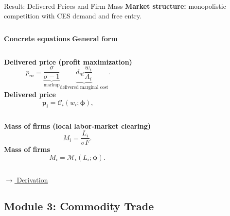 \documentclass[aspectratio=169,11pt]{beamer}
\newcommand{\B}[1]{\textcolor{blue1}{\textbf{#1}}}
\newcommand{\derivlink}[1]{%
  \hyperlink{#1}{\textcolor{blue1}{\footnotesize
  \(\longrightarrow\) Derivation}}}
\begin{document}
\begin{frame}[t,label=mainProduction]{Result: Delivered Prices and Firm Mass}
  \small
  \setlength{\abovedisplayskip}{3pt}
  \setlength{\belowdisplayskip}{3pt}
  \B{Market structure:} monopolistic competition with CES demand and free entry.

  \smallskip
  \begin{columns}[T,onlytextwidth]
      \B{Concrete equations}
      \B{General form}
  \end{columns}

  \smallskip
  \begin{columns}[T,onlytextwidth]
      \B{Delivered price (profit maximization)}
      \[
        p_{ni}
        =
        \underbrace{\frac{\sigma}{\sigma-1}}_{\text{markup}}
        \underbrace{d_{ni}\frac{w_i}{A_i}}_{\text{delivered marginal cost}}.
      \]
      \B{Delivered price}
      \[
        \mathbf p_i
        =\mathcal C_i(w_i;\boldsymbol\phi),
      \]
  \end{columns}

  \smallskip
  \begin{columns}[T,onlytextwidth]
      \B{Mass of firms (local labor-market clearing)}
      \[
        M_i=\frac{L_i}{\sigma F}.
      \]
      \B{Mass of firms}
      \[
        M_i
        =\mathcal M_i(L_i;\boldsymbol\phi).
      \]
  \end{columns}
  \smallskip
  \hfill\derivlink{appProduction}

\end{frame}

\subsection{Module 3: Commodity Trade}
\end{document}

